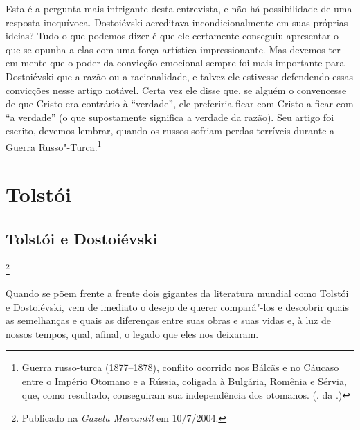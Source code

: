 Esta é a pergunta mais intrigante desta entrevista, e não há
possibilidade de uma resposta inequívoca. Dostoiévski acreditava
incondicionalmente em suas próprias ideias? Tudo o que podemos dizer é
que ele certamente conseguiu apresentar o que se opunha a elas com uma
força artística impressionante. Mas devemos ter em mente que o poder da
convicção emocional sempre foi mais importante para Dostoiévski que a
razão ou a racionalidade, e talvez ele estivesse defendendo essas
convicções nesse artigo notável. Certa vez ele disse que, se alguém o
convencesse de que Cristo era contrário à ``verdade'', ele preferiria ficar
com Cristo a ficar com ``a verdade'' (o que supostamente significa a
verdade da razão). Seu artigo foi escrito, devemos lembrar, quando os
russos sofriam perdas terríveis durante a Guerra Russo"-Turca.\footnote{Guerra russo-turca (1877--1878), conflito ocorrido nos Bálcãs e no Cáucaso entre o Império Otomano e a Rússia, coligada à Bulgária, Romênia e Sérvia, que, como resultado, conseguiram sua independência dos otomanos. (. da .)}

\bigskip



\part{Tolstói}

\chapter{Tolstói e Dostoiévski}\footnote{Publicado na \emph{Gazeta Mercantil} em 10/7/2004.}

Quando se põem frente a frente dois gigantes da literatura mundial
como Tolstói e Dostoiévski, vem de imediato o desejo de querer
compará"-los e descobrir quais as semelhanças e quais as
diferenças entre suas obras e suas vidas e, à luz de nossos
tempos, qual, afinal, o legado que eles nos deixaram. 

